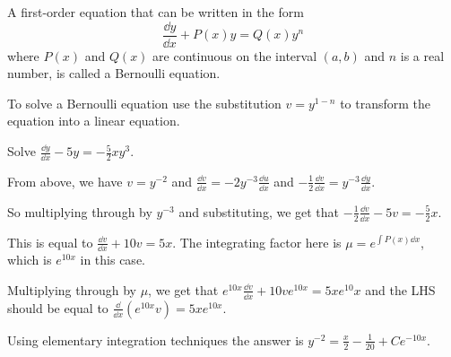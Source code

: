 \documentclass[../diffeq.tex]{subfiles}
\begin{document}
\begin{definition}
    A first-order equation that can be written in the form 
    \[ \frac{\dd y}{\dd x}+P(x)y=Q(x)y^n \]
    where $P(x)$ and $Q(x)$ are continuous on the interval $(a,b)$ and $n$ is a real number, is called a Bernoulli equation.
\end{definition}

To solve a Bernoulli equation use the substitution $v=y^{1-n}$ to transform the equation into a linear equation.

\begin{example}
    Solve $\frac{\dd y}{\dd x}-5y=-\frac{5}{2}xy^3$.

    From above, we have $v=y^{-2}$ and $\frac{\dd v}{\dd x}=-2y^{-3}\frac{\dd u}{\dd x}$ and $-\frac{1}{2}\frac{\dd v}{\dd x}=y^{-3}\frac{\dd y}{\dd x}$.

    So multiplying through by $y^{-3}$ and substituting, we get that $-\frac{1}{2}\frac{\dd v}{\dd x}-5v=-\frac{5}{2}x$.

    This is equal to $\frac{\dd v}{\dd x}+10v=5x$. The integrating factor here is $\mu = e^{\int P(x)\dd x}$, which is $e^{10x}$ in this case.

    Multiplying through by $\mu$, we get that $e^{10x}\frac{\dd v}{\dd x}+10ve^{10x}=5xe^{10}x$ and the LHS should be equal to $\frac{\dd}{\dd x}(e^{10x}v)=5xe^{10x}$.

    Using elementary integration techniques the answer is $y^{-2}=\frac{x}{2}-\frac{1}{20}+Ce^{-10x}$.
\end{example}
\end{document}
